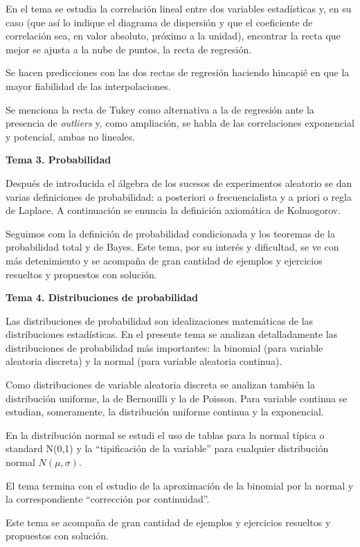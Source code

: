 \begin{adjustwidth}{50pt}{25pt}
En el tema se estudia la correlación lineal entre dos variables estadísticas y, en su caso (que así lo indique el diagrama de dispersión y que el coeficiente de correlación sea, en valor absoluto, próximo a la unidad), encontrar la recta que mejor se ajusta a la nube de puntos, la recta de regresión.

Se hacen predicciones con las dos rectas de regresión haciendo hincapié en que la mayor fiabilidad de las interpolaciones.

Se menciona la recta de Tukey como alternativa a la de regresión ante la presencia de \emph{outliers} y, como ampliación, se habla de las correlaciones exponencial y potencial, ambas no lineales.
\end{adjustwidth}

\textbf{Tema 3. Probabilidad}

\begin{adjustwidth}{50pt}{25pt}
Después de introducida el álgebra de los sucesos de experimentos aleatorio se dan varias definiciones de probabilidad: a posteriori o frecuencialista y a priori o regla de Laplace. A continuación se enuncia la definición axiomática de Kolmogorov.

Seguimos com la definición de probabilidad condicionada y los teoremas de la probabilidad total y de Bayes. Este tema, por su interés y dificultad, se ve con más detenimiento y se acompaña de gran cantidad de ejemplos y ejercicios resueltos y propuestos con solución.
\end{adjustwidth}

\textbf{Tema 4. Distribuciones de probabilidad}

\begin{adjustwidth}{50pt}{25pt}
Las distribuciones de probabilidad son idealizaciones matemáticas de las distribuciones estadísticas. En el presente tema se analizan detalladamente las distribuciones de probabilidad más importantes: la binomial (para variable aleatoria discreta) y la normal (para variable aleatoria continua).

Como distribuciones de variable aleatoria discreta se analizan también la distribución uniforme, la de Bernouilli y la de Poisson. Para variable continua se estudian, someramente, la distribución uniforme continua y la exponencial.

En la distribución normal se estudi el uso de tablas para la normal típica o standard N(0,1) y la ``tipificación de la variable'' para cualquier distribución normal $N(\mu,\sigma)$.

El tema termina con el estudio de la aproximación de la binomial por la normal y la correspondiente ``corrección por continuidad''.

Este tema se acompaña de gran cantidad de ejemplos y ejercicios resueltos y propuestos con solución.

\end{adjustwidth}

